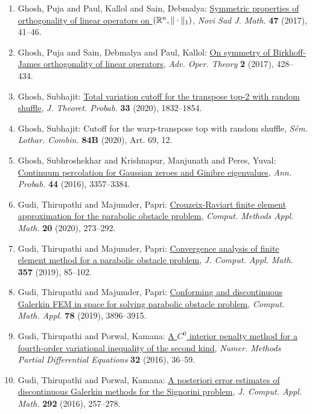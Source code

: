\begin{enumerate}
\item Ghosh, Puja and Paul, Kallol and Sain, Debmalya: \href{https://doi.org/10.30755/nsjom.04671}{Symmetric properties of orthogonality of linear operators on
{$(\Bbb R^n,\|\cdot\|_1)$}}, \emph{Novi Sad J. Math.} {\bf 47} (2017), 41--46.
\item Ghosh, Puja and Sain, Debmalya and Paul, Kallol: \href{https://doi.org/10.22034/aot.1703-1137}{On symmetry of {B}irkhoff-{J}ames orthogonality of linear
operators}, \emph{Adv. Oper. Theory} {\bf 2} (2017), 428--434.
\item Ghosh, Subhajit: \href{https://doi.org/10.1007/s10959-019-00945-6}{Total variation cutoff for the transpose top-2 with random
shuffle}, \emph{J. Theoret. Probab.} {\bf 33} (2020), 1832--1854.
\item Ghosh, Subhajit: Cutoff for the warp-transpose top with random shuffle, \emph{S\'{e}m. Lothar. Combin.} {\bf 84B} (2020), Art. 69, 12.
\item Ghosh, Subhroshekhar and Krishnapur, Manjunath and Peres,
Yuval: \href{https://doi.org/10.1214/15-AOP1051}{Continuum percolation for {G}aussian zeroes and {G}inibre
eigenvalues}, \emph{Ann. Probab.} {\bf 44} (2016), 3357--3384.
\item Gudi, Thirupathi and Majumder, Papri: \href{https://doi.org/10.1515/cmam-2019-0057}{Crouzeix-{R}aviart finite element approximation for the
parabolic obstacle problem}, \emph{Comput. Methods Appl. Math.} {\bf 20} (2020), 273--292.
\item Gudi, Thirupathi and Majumder, Papri: \href{https://doi.org/10.1016/j.cam.2019.02.026}{Convergence analysis of finite element method for a parabolic
obstacle problem}, \emph{J. Comput. Appl. Math.} {\bf 357} (2019), 85--102.
\item Gudi, Thirupathi and Majumder, Papri: \href{https://doi.org/10.1016/j.camwa.2019.06.022}{Conforming and discontinuous {G}alerkin {FEM} in space for
solving parabolic obstacle problem}, \emph{Comput. Math. Appl.} {\bf 78} (2019), 3896--3915.
\item Gudi, Thirupathi and Porwal, Kamana: \href{https://doi.org/10.1002/num.21983}{A {$C^0$} interior penalty method for a fourth-order
variational inequality of the second kind}, \emph{Numer. Methods Partial Differential Equations} {\bf 32} (2016), 36--59.
\item Gudi, Thirupathi and Porwal, Kamana: \href{https://doi.org/10.1016/j.cam.2015.07.008}{A posteriori error estimates of discontinuous {G}alerkin
methods for the {S}ignorini problem}, \emph{J. Comput. Appl. Math.} {\bf 292} (2016), 257--278.

\end{enumerate}
